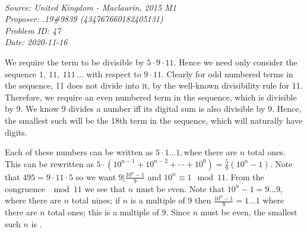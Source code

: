 \SSbreak\\
\emph{Source: United Kingdom - Maclaurin, 2015 M1}\\
\emph{Proposer: .19\#9839 (434767660182405131)}\\
\emph{Problem ID: 47}\\
\emph{Date: 2020-11-16}\\
\SSbreak
     
\bigskip

\begin{solution}\hfil\medskip

    We require the term to be divisible by \(5\cdot9\cdot 11\).
    Hence we need only consider the sequence \(1,\ 11,\ 111\,\ldots\) with respect to \(9\cdot11\).
    Clearly for odd numbered terms in the sequence, 11 does not divide into it, by the well-known divisibility rule for 11.
    Therefore, we require an even numbered term in the sequence, which is divisible by 9.
    We know 9 divides a number iff its digital sum is also divisible by 9.
    Hence, the smallest such will be the 18th term in the sequence, which will naturally have  digits. 
\end{solution}\bigskip

\begin{solution}\hfil\medskip
     
    Each of these numbers can be written as \(5\cdot1\ldots1,\)whee there are \(n\) total ones.
    This can be rewritten as \(5\cdot(10^{n-1}+10^{n-2}+\cdots+10^0)=\frac{5}{9}(10^n-1)\).
    Note that \(495=9\cdot11\cdot5\) so we want \(9|\frac{10^n-1}{9}\) and \(10^n\equiv1\mod{11}\).
    From the congruence \(\mod{11}\) we see that \(n\) must be even.
    Note that \(10^n-1=9\ldots9\), where there are \(n\) total nines; if \(n\) is a multiple of 9 then \(\frac{10^n-1}{9}=1\ldots1\) where there are \(n\) total ones; this is a multiple of 9.
    Since \(n\) must be even, the smallest such \(n\) is .
\end{solution}
